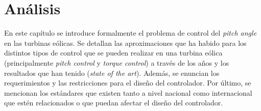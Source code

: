 \chapter{Análisis}

En este capítulo se introduce formalmente el problema de control del \emph{pitch angle} en las turbinas eólicas. Se detallan las aproximaciones que ha habido para los distintos tipos de control que se pueden realizar en una turbina eólica (principalmente \emph{pitch control} y \emph{torque control}) a través de los años y los resultados que han tenido (\emph{state of the art}). Además, se enuncian los requerimientos y las restricciones para el diseño del controlador. Por último, se mencionan los estándares que existen tanto a nivel nacional como internacional que estén relacionados o que puedan afectar el diseño del controlador.

